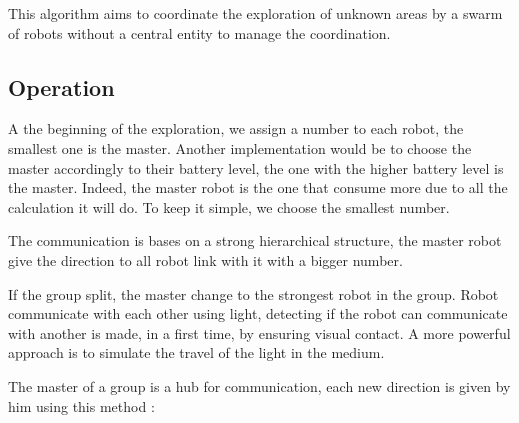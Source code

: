 \documentclass[../main.tex]{subfiles}
\begin{document}
This algorithm aims to coordinate the exploration of unknown areas by a swarm of robots without a central entity to manage the coordination.

\subsection{Operation}

A the beginning of the exploration, we assign a number to each robot, the smallest one is the master. Another implementation would be to choose the master accordingly to their battery level, the one with the higher battery level is the master. Indeed, the master robot is the one that consume more due to all the calculation it will do. To keep it simple, we choose the smallest number.

The communication is bases on a strong hierarchical structure, the master robot give the direction to all robot link with it with a bigger number.

If the group split, the master change to the strongest robot in the group.
Robot communicate with each other using light, detecting if the robot can communicate with another is made, in a first time, by ensuring visual contact. A more powerful approach is to simulate the travel of the light in the medium.

The master of a group is a hub for communication, each new direction is given by him using this method :
\end{document}
